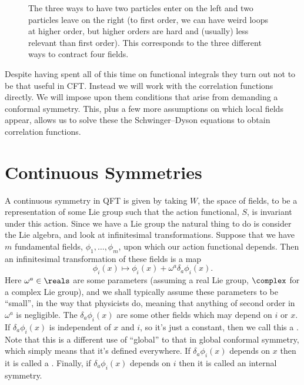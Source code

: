 \documentclass[fleqn]{NotesClass}
\begin{document}
    \begin{figure}
        \caption{The three ways to have two particles enter on the left and two particles leave on the right (to first order, we can have weird loops at higher order, but higher orders are hard and (usually) less relevant than first order). This corresponds to the three different ways to contract four fields.}
        \label{fig:swapping bosons}
    \end{figure}
    
    Despite having spent all of this time on functional integrals they turn out not to be that useful in CFT.
    Instead we will work with the correlation functions directly.
    We will impose upon them conditions that arise from demanding a conformal symmetry.
    This, plus a few more assumptions on which local fields appear, allows us to solve these the Schwinger--Dyson equations to obtain correlation functions.
    
    
    \section{Continuous Symmetries}
    A continuous symmetry in QFT is given by taking \(W\), the space of fields, to be a representation of some Lie group such that the action functional, \(S\), is invariant under this action.
    Since we have a Lie group the natural thing to do is consider the Lie algebra, and look at infinitesimal transformations.
    Suppose that we have \(m\) fundamental fields, \(\phi_1, \dotsc, \phi_m\), upon which our action functional depends.
    Then an infinitesimal transformation of these fields is a map
    \begin{equation}
        \phi_i(x) \mapsto \phi_i(x) + \omega^a \delta_a\phi_i(x).
    \end{equation}
    Here \(\omega^a \in \reals\) are some parameters (assuming a real Lie group, \(\complex\) for a complex Lie group), and we shall typically assume these parameters to be \enquote{small}, in the way that physicists do, meaning that anything of second order in \(\omega^a\) is negligible.
    The \(\delta_a \phi_i(x)\) are some other fields which may depend on \(i\) or \(x\).
    If \(\delta_a \phi_i(x)\) is independent of \(x\) and \(i\), so it's just a constant, then we call this a .
    Note that this is a different use of \enquote{global} to that in global conformal symmetry, which simply means that it's defined everywhere.
    If \(\delta_a \phi_i(x)\) depends on \(x\) then it is called a .
    Finally, if \(\delta_a \phi_i(x)\) depends on \(i\) then it is called an internal symmetry.
    
\end{document}
